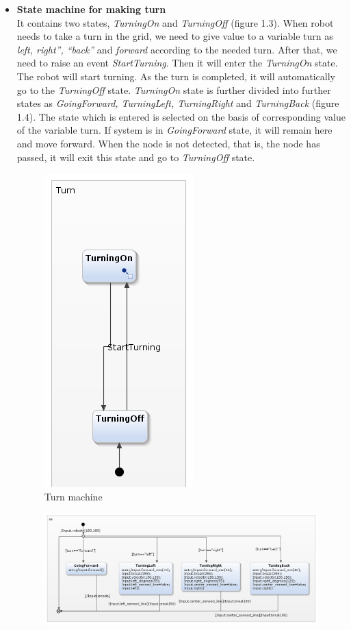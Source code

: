 \documentclass[a4paper,12pt,oneside]{book}
\begin{document}
\begin{itemize}
\item \textbf{State machine for making turn}\\
It contains two states, \textit{TurningOn} and \textit{TurningOff} (figure 1.3). When robot needs to take a turn in the grid, we need to give value to a variable turn as \textit{left, right”, “back”} and \textit{forward} according to the needed turn. After that, we need to raise an event \textit{StartTurning}. Then it will enter the \textit{TurningOn} state. The robot will start turning. As the turn is completed, it will automatically go to the \textit{TurningOff} state.
\textit{TurningOn} state is further divided into further states as \textit{GoingForward, TurningLeft, TurningRight} and \textit{TurningBack} (figure 1.4).
The state which is entered is selected on the basis of corresponding value of the variable turn.
If system is in \textit{GoingForward} state, it will remain here and move forward. When the node is not detected, that is, the node has passed, it will exit this state and go to \textit{TurningOff} state.
	\begin{figure}[!htbp]
	\centering
	\includegraphics[scale=.6]{turn.png}
	\caption{Turn machine}
\end{figure}
\begin{figure}[!htbp]
	\centering
	\includegraphics[scale=.65]{turning_on.png}

\end{figure}
\end{itemize}
\end{document}
